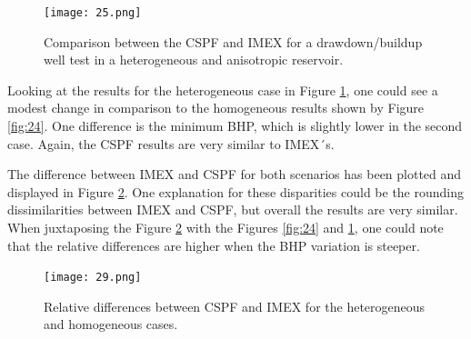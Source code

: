 \begin{figure}[h]
	\centering
	\texttt{[image: 25.png]}
	\caption{Comparison between the CSPF and IMEX for a drawdown/buildup well test in a heterogeneous and anisotropic reservoir.}
	\label{fig:25}
\end{figure}

Looking at the results for the heterogeneous case in Figure \ref{fig:25}, one could see a modest change in comparison to the homogeneous results shown by Figure \ref{fig:24}. One difference is the minimum BHP, which is slightly lower in the second case. Again, the CSPF results are very similar to IMEX´s.

The difference between IMEX and CSPF for both scenarios has been plotted and displayed in Figure \ref{fig:29}. One explanation for these disparities could be the rounding dissimilarities between IMEX and CSPF, but overall the results are very similar. When juxtaposing the Figure \ref{fig:29} with the Figures \ref{fig:24} and \ref{fig:25}, one could note that the relative differences are higher when the BHP variation is steeper.
\begin{figure}[h]
	\centering
	\texttt{[image: 29.png]}
	\caption{Relative differences between CSPF and IMEX for the heterogeneous and homogeneous cases.}
	\label{fig:29}
\end{figure}


